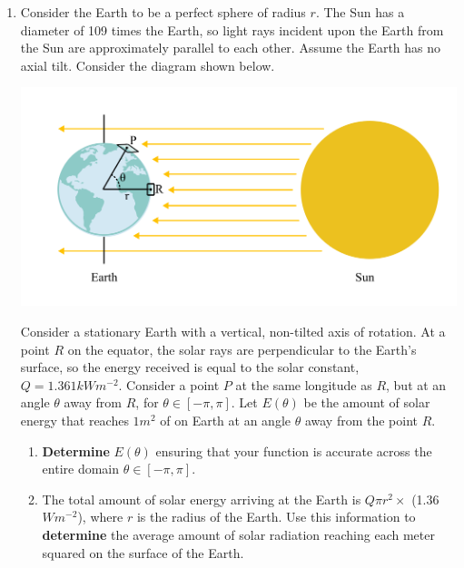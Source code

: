 \documentclass{exam}
\begin{document}
\begin{enumerate}
    \item Consider the Earth to be a perfect sphere of radius $r$. The Sun has a diameter of 109 times the Earth, so light rays incident upon the Earth from the Sun are approximately parallel to each other. Assume the Earth has no axial tilt. Consider the diagram shown below.

    \begin{centering}
        \includegraphics[scale=1]{sunrayqa.png}
    \end{centering}
 
    Consider a stationary Earth with a vertical, non-tilted axis of rotation. At a point $R$ on the equator, the solar rays are perpendicular to the Earth’s surface, so the energy received is equal to the solar constant, $Q=1.361 kWm^{-2}$. Consider a point $P$ at the same longitude as $R$, but at an angle $\theta$ away from $R$, for $\theta \in [-\pi,\pi]$. Let $E( \theta )$ be the amount of solar energy that reaches $1m^2$ of on Earth at an angle $\theta$ away from the point $R$. %
    
    \begin{enumerate}
        \item \textbf{Determine} $E(\theta)$ ensuring that your function is accurate across the entire domain $\theta \in [-\pi,\pi]$.

 
    
        \item The total amount of solar energy arriving at the Earth is $Q \pi r^2 \times$ (1.36 $W m^{-2}$), where $r$ is the radius of the Earth. Use this information to \textbf{determine} the average amount of solar radiation reaching each meter squared on the surface of the Earth.




\end{enumerate}
\end{enumerate}
\end{document}
